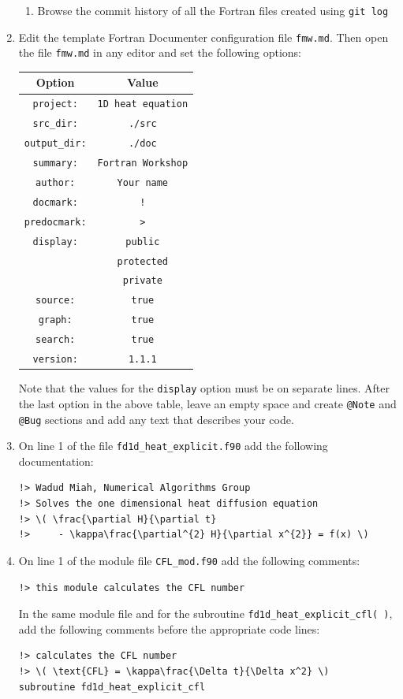 \documentclass[12pt]{article}
\begin{document}
\begin{enumerate}
\begin{enumerate}
\item Browse the commit history of all the Fortran files created using \texttt{git log}
\end{enumerate}
\item Edit the template Fortran Documenter configuration file \texttt{fmw.md}. Then open the file \texttt{fmw.md}
in any editor and set the following options:
\begin{center}
\begin{tabular}{| c | c |} \hline
{\bf Option} & {\bf Value} \\ \hline
\texttt{project:} & \texttt{1D heat equation} \\ \hline
\texttt{src\_dir:} & \texttt{./src} \\ \hline
\texttt{output\_dir:} & \texttt{./doc} \\ \hline
\texttt{summary:} & \texttt{Fortran Workshop} \\ \hline
\texttt{author:} & \texttt{Your name} \\ \hline
\texttt{docmark:} & \texttt{!} \\ \hline
\texttt{predocmark:} & \texttt{>} \\ \hline
\texttt{display:} & \texttt{public} \\ 
                  & \texttt{protected} \\ 
                  & \texttt{private} \\ \hline
\texttt{source:} & \texttt{true} \\ \hline
\texttt{graph:} & \texttt{true} \\ \hline
\texttt{search:} & \texttt{true} \\ \hline
\texttt{version:} & \texttt{1.1.1} \\ \hline
\end{tabular}
\end{center}
Note that the values for the \texttt{display} option must be on separate lines.
After the last option in the above table, leave an empty space and create \texttt{@Note} and \texttt{@Bug}
sections and add any text that describes your code.
\item On line 1 of the file \texttt{fd1d\_heat\_explicit.f90} add the following documentation:
\begin{verbatim}
!> Wadud Miah, Numerical Algorithms Group
!> Solves the one dimensional heat diffusion equation
!> \( \frac{\partial H}{\partial t} 
!>     - \kappa\frac{\partial^{2} H}{\partial x^{2}} = f(x) \)
\end{verbatim}
\item On line 1 of the module file \texttt{CFL\_mod.f90} add the following comments:
\begin{verbatim}
!> this module calculates the CFL number
\end{verbatim}
In the same module file and for the subroutine \texttt{fd1d\_heat\_explicit\_cfl( )}, add
the following comments before the appropriate code lines:
\begin{verbatim}
!> calculates the CFL number  
!> \( \text{CFL} = \kappa\frac{\Delta t}{\Delta x^2} \)
subroutine fd1d_heat_explicit_cfl


\end{verbatim}
\end{enumerate}
\end{document}
